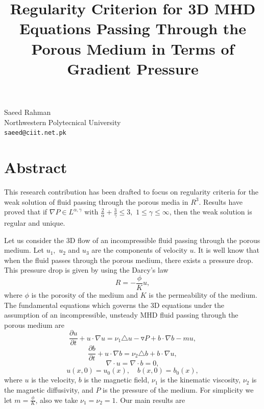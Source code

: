 \documentclass[article, A4, 11pt]{llncs}%
\begin{document}
\title{Regularity Criterion for 3D MHD Equations Passing Through the Porous Medium in Terms of Gradient Pressure}
 \author{} \institute{}
\maketitle
\begin{center}
{\large Saeed  Rahman}\\
Northwestern Polytecnical University\\
{\tt saeed@ciit.net.pk}
\end{center}

\section*{Abstract}
This research contribution has been drafted to focus on regularity criteria for the weak solution of fluid passing through the porous media in $R^{3}$.  Results have proved that if $ \nabla P\in L^{\alpha,\gamma}$ with $\frac {2}{\alpha}+\frac {3}{\gamma}\leq3,$ $1\leq\gamma\leq\infty$, then the weak solution is regular and unique.

Let us consider the 3D flow of an incompressible fluid passing through the porous medium. Let $u_{1},$ $u_{2}$ and $u_{3}$ are the components of velocity
$u.$ It is well know that when the fluid passes through the porous medium, there exists a pressure drop. This pressure drop is given by using the Darcy's law
\begin{equation*}
R=-\frac {\phi} {K} u,
\end{equation*}
where $\phi$ is the porosity of the medium and $K$ is the permeability of the medium. The fundamental equations which governs the 3D equations under the assumption of an incompressible, unsteady MHD fluid passing through the porous medium are
\begin{equation}
\frac{\partial u}{\partial t}+u\cdot\nabla u
=\nu_{1}\triangle u-\triangledown P+
b\cdot\nabla b-mu,
\end{equation}
\begin{equation}
\frac{\partial b}{\partial t}+u\cdot\nabla b
=\nu_{2}\triangle b + b\cdot\nabla u,
\end{equation}
\begin{equation}
\nabla\cdot u= \nabla\cdot b=0,
\end{equation}
\begin{equation}\label {6}
u(x,0)=u_{0}(x),
\quad b(x,0)=b_{0}(x),
\end{equation}
where $u$ is the velocity, $b$ is the magnetic field, $\nu_{1}$ is the kinematic viscosity, $\nu_{2}$ is the magnetic diffusivity, and $P$ is the pressure of the medium. For simplicity we let $m=\frac {\phi}{K}$, also we take $\nu_{1}=\nu_{2}=1.$ Our main results are
\end{document}
